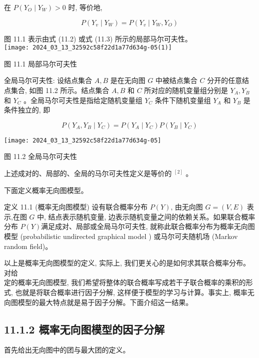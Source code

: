 \documentclass[10pt]{article}
\begin{document}
\begin{CJK*}{UTF8}{bsmi}
在 $P\left(Y_{O} \mid Y_{W}\right)>0$ 时, 等价地,


\begin{equation*}
P\left(Y_{v} \mid Y_{W}\right)=P\left(Y_{v} \mid Y_{W}, Y_{O}\right) \tag{11.3}
\end{equation*}


图 11.1 表示由式 (11.2) 或式 (11.3) 所示的局部马尔可夫性。\\
\texttt{[image: 2024\_03\_13\_32592c58f22d1a77d634g-05(1)]}

图 11.1 局部马尔可夫性

全局马尔可夫性: 设结点集合 $A, B$ 是在无向图 $G$ 中被结点集合 $C$ 分开的任意结点集合, 如图 11.2 所示。结点集合 $A, B$ 和 $C$ 所对应的随机变量组分别是 $Y_{A}, Y_{B}$ 和 $Y_{C}$ 。全局马尔可夫性是指给定随机变量组 $Y_{C}$ 条件下随机变量组 $Y_{A}$ 和 $Y_{B}$ 是条件独立的, 即


\begin{equation*}
P\left(Y_{A}, Y_{B} \mid Y_{C}\right)=P\left(Y_{A} \mid Y_{C}\right) P\left(Y_{B} \mid Y_{C}\right) \tag{11.4}
\end{equation*}


\begin{center}
\texttt{[image: 2024\_03\_13\_32592c58f22d1a77d634g-05]}
\end{center}

图 11.2 全局马尔可夫性

上述成对的、局部的、全局的马尔可夫性定义是等价的 ${ }^{[2]}$ 。

下面定义概率无向图模型。

定义 11.1 (概率无向图模型) 设有联合概率分布 $P(Y)$, 由无向图 $G=(V, E)$ 表示,在图 $G$ 中, 结点表示随机变量, 边表示随机变量之间的依赖关系。如果联合概率分布 $P(Y)$满足成对、局部或全局马尔可夫性, 就称此联合概率分布为概率无向图模型 (probabilistic undirected graphical model ) 或马尔可夫随机场 (Markov random field)。

以上是概率无向图模型的定义, 实际上, 我们更关心的是如何求其联合概率分布。对给\\
定的概率无向图模型, 我们希望将整体的联合概率写成若干子联合概率的乘积的形式, 也就是将联合概率进行因子分解, 这样便于模型的学习与计算。事实上, 概率无向图模型的最大特点就是易于因子分解。下面介绍这一结果。

\subsection*{11.1.2 概率无向图模型的因子分解}
首先给出无向图中的团与最大团的定义。


\end{CJK*}
\end{document}
